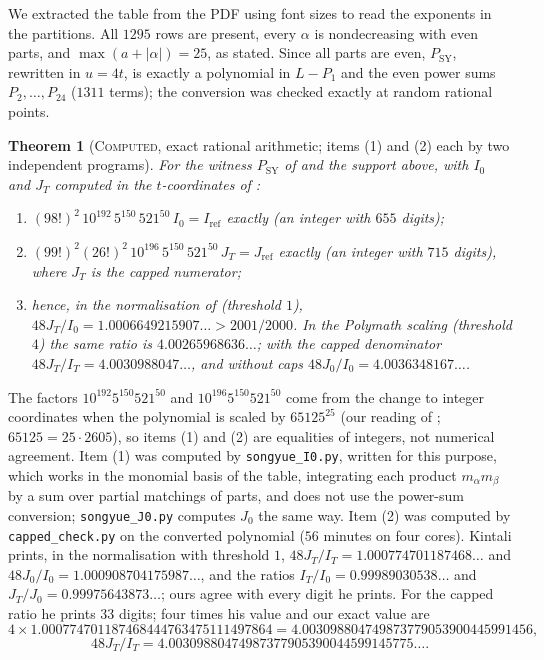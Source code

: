 \documentclass[11pt]{amsart}
\newtheorem{theorem}{Theorem}
\theoremstyle{definition}
\theoremstyle{remark}
\newcommand{\lbl}[1]{\textup{\textsc{#1}}}
\begin{document}
We extracted the table from the PDF using font sizes to read the exponents in
the partitions. All $1295$ rows are present, every $\alpha$ is nondecreasing
with even parts, and $\max(a+|\alpha|)=25$, as stated. Since all parts are
even, $P_{\mathrm{SY}}$, rewritten in $u=4t$, is exactly a polynomial in $L-P_1$ and the even power sums
$P_2,\dots,P_{24}$ ($1311$ terms); the conversion was checked exactly at random
rational points.

\begin{theorem}[\lbl{Computed}, exact rational arithmetic; items (1) and (2) each by two independent programs]\label{thm:sy}
For the witness $P_{\mathrm{SY}}$ of \cite{SY26} and the support above, with
$I_0$ and $J_T$ computed in the $t$-coordinates of \cite{SY26}:
\begin{enumerate}
\item $(98!)^2\,10^{192}\,5^{150}\,521^{50}\,I_0=I_{\mathrm{ref}}$ exactly
(an integer with $655$ digits);
\item $(99!)^2(26!)^2\,10^{196}\,5^{150}\,521^{50}\,J_T=J_{\mathrm{ref}}$
exactly (an integer with $715$ digits), where $J_T$ is the capped numerator;
\item hence, in the normalisation of \cite{SY26} (threshold $1$),
$48J_T/I_0=1.0006649215907\ldots>2001/2000$. In the Polymath scaling
(threshold $4$) the same ratio is $4.00265968636\ldots$; with the capped
denominator $48J_T/I_T=4.0030988047\ldots$, and without caps
$48J_0/I_0=4.0036348167\ldots$.
\end{enumerate}
\end{theorem}

The factors $10^{192}5^{150}521^{50}$ and $10^{196}5^{150}521^{50}$ come from the
change to integer coordinates when the polynomial is scaled by $65125^{25}$
(our reading of \cite[Eq.~(71)]{SY26}; $65125=25\cdot2605$), so items (1) and
(2) are equalities of integers, not numerical agreement. Item (1) was computed
by \texttt{songyue\_I0.py}, written for this purpose, which works in the monomial basis of
the table, integrating each product $m_\alpha m_\beta$ by a sum over partial
matchings of parts, and does not use the power-sum conversion;
\texttt{songyue\_J0.py} computes $J_0$ the same way. Item (2) was
computed by \texttt{capped\_check.py} on the converted polynomial ($56$ minutes
on four cores). Kintali \cite{Kin26} prints, in the normalisation with
threshold $1$, $48J_T/I_T=1.000774701187468\ldots$ and
$48J_0/I_0=1.000908704175987\ldots$, and the ratios $I_T/I_0=0.99989030538\ldots$
and $J_T/J_0=0.99975643873\ldots$; ours agree with every digit he prints. For
the capped ratio he prints $33$ digits; four times his value and our exact
value are
\[
4\times1.000774701187468444763475111497864=4.003098804749873779053900445991456,
\]
\[
48J_T/I_T=4.00309880474987377905390044599145775\ldots.
\]
\end{document}
